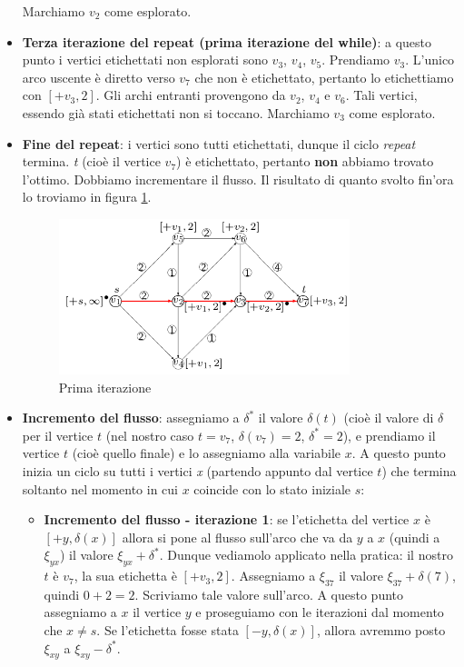 \documentclass[11pt]{book}
\begin{document}
\begin{itemize}
  Marchiamo $v_2$ come esplorato.

\item {\bf Terza iterazione del repeat (prima iterazione del while)}:
  a questo punto i vertici etichettati non esplorati sono $v_3$,
  $v_4$, $v_5$. Prendiamo $v_3$. L'unico arco uscente \`e diretto
  verso $v_7$ che non \`e etichettato, pertanto lo etichettiamo con
  $[+v_3, 2]$. Gli archi entranti provengono da $v_2$, $v_4$ e
  $v_6$. Tali vertici, essendo gi\`a stati etichettati non si
  toccano. Marchiamo $v_3$ come esplorato.  


\item {\bf Fine del repeat}: i vertici sono tutti etichettati, dunque
  il ciclo {\em repeat} termina. {\em t} (cio\`e il vertice $v_7$) \`e
  etichettato, pertanto {\bf non} abbiamo trovato l'ottimo. Dobbiamo
  incrementare il flusso. Il risultato di quanto svolto fin'ora lo
  troviamo in figura \ref{cap7figura781}.

\begin{figure}[h!]
  \centering
  \includegraphics[width=0.8\textwidth]{images/cap7figura781.png}
  \caption{Prima iterazione}
  \label{cap7figura781}
\end{figure}

\item {\bf Incremento del flusso}: assegniamo a $\delta^*$ il valore
  $\delta(t)$ (cio\`e il valore di $\delta$ per il vertice $t$ (nel
  nostro caso $t = v_7$, $\delta(v_7) = 2$, $\delta^* = 2$), e
  prendiamo il vertice $t$ (cio\`e quello finale) e lo assegniamo alla
  variabile $x$. A questo punto inizia un ciclo su tutti i vertici
  {\em x} (partendo appunto dal vertice $t$) che termina soltanto nel
  momento in cui $x$ coincide con lo stato iniziale $s$:
  
  \begin{itemize}   
  \item {\bf Incremento del flusso - iterazione 1}: se l'etichetta del
    vertice $x$ \`e $[+y, \delta(x)]$ allora si pone al flusso
    sull'arco che va da $y$ a $x$ (quindi a $\xi_{yx}$) il valore
    $\xi_{yx}+\delta^*$. Dunque vediamolo applicato nella pratica: il
    nostro $t$ \`e $v_7$, la sua etichetta \`e $[+v_3,2]$. Assegniamo a
    $\xi_{37}$ il valore $\xi_{37} + \delta(7)$, quindi $0 + 2 =
    2$. Scriviamo tale valore sull'arco.  A questo punto assegniamo a
    $x$ il vertice $y$ e proseguiamo con le iterazioni dal momento che
    $x \neq s$. Se l'etichetta fosse stata $[-y, \delta(x)]$, allora
    avremmo posto $\xi_{xy}$ a $\xi_{xy}-\delta^*$.


\end{itemize}
\end{itemize}
\end{document}
